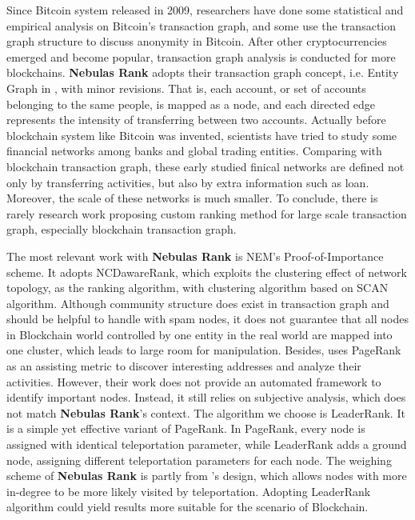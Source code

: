 Since Bitcoin\cite{Nakamoto2008} system released in 2009, researchers have done some statistical and empirical analysis on Bitcoin's transaction graph\cite{Ron}\cite{Haslhofer}\cite{NielKondor2014}\cite{Baumann2014}, and some use the transaction graph structure to discuss anonymity in Bitcoin\cite{Meiklejohn2013}\cite{Ober2013}\cite{pham2016anomaly}\cite{Fleder2015}\cite{Ferrin2015}. After other cryptocurrencies emerged and become popular, transaction graph analysis is conducted for more blockchains\cite{Chang2017}\cite{Anderson2016}. \textbf{Nebulas Rank} adopts their transaction graph concept, i.e. Entity Graph in \cite{Tschorsch2015}, with minor revisions. That is, each account, or set of accounts belonging to the same people, is mapped as a node, and each directed edge represents the intensity of transferring between two accounts. Actually before blockchain system like Bitcoin was invented, scientists have tried to study some financial networks among banks and global trading entities\cite{propper2008towards}\cite{Boss2004}\cite{Serrano2007}\cite{Bech2008}\cite{Fagiolo2009}\cite{Morten2006}\cite{Boss2004a}\cite{Krempel2002}\cite{Serrano2003}. Comparing with blockchain transaction graph, these early studied finical networks are defined not only by transferring activities, but also by extra information such as loan. Moreover, the scale of these networks is much smaller. To conclude, there is rarely research work proposing custom ranking method for large scale transaction graph, especially blockchain transaction graph.

The most relevant work with \textbf{Nebulas Rank} is NEM\cite{nem}'s Proof-of-Importance scheme. It adopts NCDawareRank\cite{Nikolakopoulos2013}, which exploits the clustering effect of network topology, as the ranking algorithm, with clustering algorithm based on SCAN algorithm\cite{xu2007scan}\cite{shiokawa2015scan}\cite{chang2017mathsf}. Although community structure does exist in transaction graph and should be helpful to handle with spam nodes, it does not guarantee that all nodes in Blockchain world controlled by one entity in the real world are mapped into one cluster, which leads to large room for manipulation. Besides, \textcite{Fleder2015} uses PageRank\cite{Brin2010}\cite{page1999pagerank} as an assisting metric to discover interesting addresses and analyze their activities. However, their work does not provide an automated framework to identify important nodes. Instead, it still relies on subjective analysis, which does not match \textbf{Nebulas Rank}'s context. The algorithm we choose is LeaderRank\cite{Chen2013}\cite{Li2014}. It is a simple yet effective variant of PageRank\cite{Brin2010}\cite{page1999pagerank}. In PageRank, every node is assigned with identical teleportation parameter, while LeaderRank adds a ground node, assigning different teleportation parameters for each node. The weighing scheme of \textbf{Nebulas Rank} is partly from \textcite{Li2014}'s design, which allows nodes with more in-degree to be more likely visited by teleportation. Adopting LeaderRank algorithm could yield results more suitable for the scenario of Blockchain.